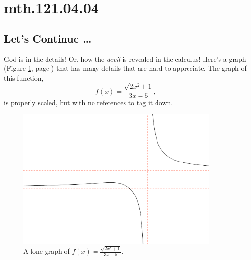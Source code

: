 \documentclass[12pt,addpoints, answers, fleqn]{exam}
\begin{document}
\section{mth.121.04.04}
\subsection{Let's Continue \ldots}

God is in the details! Or, how the \emph{devil} is revealed in the calculus! Here's a graph (Figure \ref{fig:graph21012}, page \pageref{fig:graph21012}) that has many details that are hard to appreciate. The graph of this function, 
\[
f\left(x \right) = \frac{\sqrt{2x^2+1}}{3x-5},
\]
 is properly scaled, but with no references to tag it down.
\begin{figure}[htbp] %
   \centering
   \includegraphics[width=4in]{./graphics/graph21012.pdf} 
   \caption{A lone graph of $\displaystyle f\left(x \right) = \frac{\sqrt{2x^2+1}}{3x-5}$.}
   \label{fig:graph21012}
\end{figure}
\end{document}
